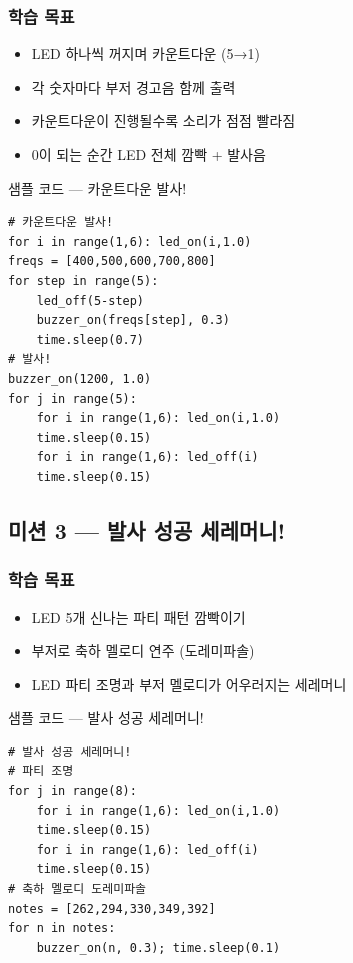 \subsubsection*{학습 목표}
\begin{itemize}[leftmargin=1.4em]
  \item LED 하나씩 꺼지며 카운트다운 (5→1)
  \item 각 숫자마다 부저 경고음 함께 출력
  \item 카운트다운이 진행될수록 소리가 점점 빨라짐
  \item 0이 되는 순간 LED 전체 깜빡 + 발사음
\end{itemize}

\begin{labbox}{샘플 코드 --- 카운트다운 발사!}
\begin{verbatim}
# 카운트다운 발사!
for i in range(1,6): led_on(i,1.0)
freqs = [400,500,600,700,800]
for step in range(5):
    led_off(5-step)
    buzzer_on(freqs[step], 0.3)
    time.sleep(0.7)
# 발사!
buzzer_on(1200, 1.0)
for j in range(5):
    for i in range(1,6): led_on(i,1.0)
    time.sleep(0.15)
    for i in range(1,6): led_off(i)
    time.sleep(0.15)
\end{verbatim}
\end{labbox}

\subsection{미션 3 --- 발사 성공 세레머니!}
\label{subsec:ch11-m3}

\begin{storybox}
\end{storybox}

\subsubsection*{학습 목표}
\begin{itemize}[leftmargin=1.4em]
  \item LED 5개 신나는 파티 패턴 깜빡이기
  \item 부저로 축하 멜로디 연주 (도레미파솔)
  \item LED 파티 조명과 부저 멜로디가 어우러지는 세레머니
\end{itemize}

\begin{labbox}{샘플 코드 --- 발사 성공 세레머니!}
\begin{verbatim}
# 발사 성공 세레머니!
# 파티 조명
for j in range(8):
    for i in range(1,6): led_on(i,1.0)
    time.sleep(0.15)
    for i in range(1,6): led_off(i)
    time.sleep(0.15)
# 축하 멜로디 도레미파솔
notes = [262,294,330,349,392]
for n in notes:
    buzzer_on(n, 0.3); time.sleep(0.1)
\end{verbatim}
\end{labbox}

